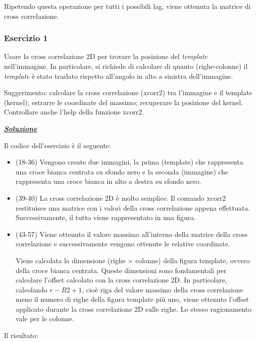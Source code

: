 \documentclass[a4paper]{article}
\begin{document}
	\noindent
	Ripetendo questa operazione per tutti i possibili lag, viene ottenuta la matrice di cross correlazione.\newpage
	
	\subsubsection{Esercizio 1}
	
	Usare la cross correlazione 2D per trovare la posizione del \emph{template} nell'immagine. In particolare, si richiede di calcolare di quanto (righe-colonne) il \emph{template} è stato traslato rispetto all'angolo in alto a sinistra dell'immagine. \newline
	
	\noindent
	Suggerimento: calcolare la cross correlazione (\textsf{xcorr2}) tra l'immagine e il template (kernel); estrarre le coordinate del massimo; recuperare la posizione del kernel. Controllare anche l'help della funzione \textsf{xcorr2}.\newline
	
	\noindent
	\textcolor{Green4}{\textbf{\underline{\emph{Soluzione}}}}\newline
	
	\noindent
	Il codice dell'esercizio è il seguente:
	
	\begin{itemize}
		\item (18-36) Vengono create due immagini, la prima (template) che rappresenta una croce bianca centrata su sfondo nero e la seconda (immagine) che rappresenta una croce bianca in alto a destra su sfondo nero.
		
		\item (39-40) La cross correlazione 2D è molto semplice. Il comando \textsf{xcorr2} restituisce una matrice con i valori della cross correlazione appena effettuata. Successivamente, il tutto viene rappresentato in una figura.
		
		\item (43-57) Viene ottenuto il valore massimo all'interno della matrice della cross correlazione e successivamente vengono ottenute le relative coordinate.
		
		Viene calcolata la dimensione (righe $\times$ colonne) della figura template, ovvero della croce bianca centrata. Queste dimensioni sono fondamentali per calcolare l'offset calcolato con la cross correlazione 2D. In particolare, calcolando $r-R2+1$, cioè riga del valore massimo della cross correlazione meno il numero di righe della figura template più uno, viene ottenuto l'offset applicato durante la cross correlazione 2D sulle righe. Lo stesso ragionamento vale per le colonne.
	\end{itemize}
	\noindent
	Il risultato:\newline
	
\end{document}
